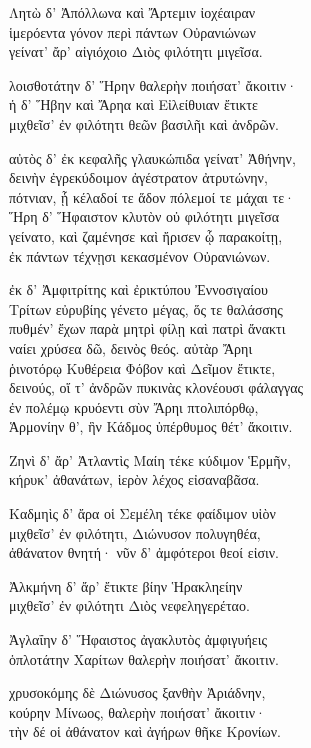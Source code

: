 \quad{}Λητὼ δ' Ἀπόλλωνα καὶ Ἄρτεμιν ἰοχέαιραν \\
ἱμερόεντα γόνον περὶ πάντων Οὐρανιώνων\\
γείνατ' ἄρ' αἰγιόχοιο Διὸς φιλότητι μιγεῖσα. 

\quad{}λοισθοτάτην δ' Ἥρην θαλερὴν ποιήσατ' ἄκοιτιν· \\
ἡ δ' Ἥβην καὶ Ἄρηα καὶ Εἰλείθυιαν ἔτικτε \\
μιχθεῖσ' ἐν φιλότητι θεῶν βασιλῆι καὶ ἀνδρῶν. 

\quad{}αὐτὸς δ' ἐκ κεφαλῆς γλαυκώπιδα γείνατ' Ἀθήνην, \\
δεινὴν ἐγρεκύδοιμον ἀγέστρατον ἀτρυτώνην,  \\
πότνιαν, ᾗ κέλαδοί τε ἅδον πόλεμοί τε μάχαι τε· \\
Ἥρη δ' Ἥφαιστον κλυτὸν οὐ φιλότητι μιγεῖσα\\
γείνατο, καὶ ζαμένησε καὶ ἤρισεν ᾧ παρακοίτῃ,\\
ἐκ πάντων τέχνῃσι κεκασμένον Οὐρανιώνων.

\quad{}ἐκ δ' Ἀμφιτρίτης καὶ ἐρικτύπου Ἐννοσιγαίου \\
Τρίτων εὐρυβίης γένετο μέγας, ὅς τε θαλάσσης \\
πυθμέν' ἔχων παρὰ μητρὶ φίλῃ καὶ πατρὶ ἄνακτι\\
ναίει χρύσεα δῶ, δεινὸς θεός. αὐτὰρ Ἄρηι\\
ῥινοτόρῳ Κυθέρεια Φόβον καὶ Δεῖμον ἔτικτε, \\
δεινούς, οἵ τ' ἀνδρῶν πυκινὰς κλονέουσι φάλαγγας \\
ἐν πολέμῳ κρυόεντι σὺν Ἄρηι πτολιπόρθῳ,\\
Ἁρμονίην θ', ἣν Κάδμος ὑπέρθυμος θέτ' ἄκοιτιν. 

\quad{}Ζηνὶ δ' ἄρ' Ἀτλαντὶς Μαίη τέκε κύδιμον Ἑρμῆν,\\
κήρυκ' ἀθανάτων, ἱερὸν λέχος εἰσαναβᾶσα.

\quad{}Καδμηὶς δ' ἄρα οἱ Σεμέλη τέκε φαίδιμον υἱὸν  \\
μιχθεῖσ' ἐν φιλότητι, Διώνυσον πολυγηθέα, \\
ἀθάνατον θνητή· νῦν δ' ἀμφότεροι θεοί εἰσιν. 

\quad{}Ἀλκμήνη δ' ἄρ' ἔτικτε βίην Ἡρακληείην\\
μιχθεῖσ' ἐν φιλότητι Διὸς νεφεληγερέταο. 

\quad{}Ἀγλαΐην δ' Ἥφαιστος ἀγακλυτὸς ἀμφιγυήεις  \\
ὁπλοτάτην Χαρίτων θαλερὴν ποιήσατ' ἄκοιτιν.

\quad{}χρυσοκόμης δὲ Διώνυσος ξανθὴν Ἀριάδνην,\\
κούρην Μίνωος, θαλερὴν ποιήσατ' ἄκοιτιν· \\
τὴν δέ οἱ ἀθάνατον καὶ ἀγήρων θῆκε Κρονίων.

